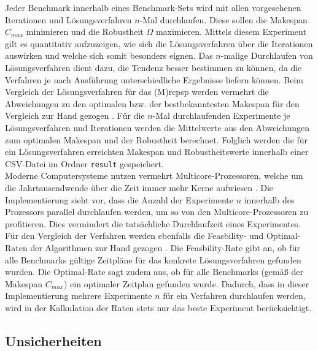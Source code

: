 Jeder Benchmark innerhalb eines Benchmark-Sets wird mit allen vorgesehenen Iterationen und Lösungsverfahren $n$-Mal durchlaufen. Diese sollen die Makespan $C_{max}$ minimieren und die Robustheit $\Omega$ maximieren. Mittels diesem Experiment gilt es quantitativ aufzuzeigen, wie sich die Lösungsverfahren über die Iterationen auswirken und welche sich somit besonders eignen. Das $n$-malige Durchlaufen von Lösungsverfahren dient dazu, die Tendenz besser bestimmen zu können, da die Verfahren je nach Ausführung unterschiedliche Ergebnisse liefern können. Beim Vergleich der Lösungsverfahren für das (M)\ac{rcpsp} werden vermehrt die Abweichungen zu den optimalen bzw. der bestbekanntesten Makespan für den Vergleich zur Hand gezogen \cite[vgl.][S. 16 ff.]{kolisch_heuristic_1998} \cite[vgl.][S. 147]{jozefowska_simulated_2001} \cite[vgl.][S. 10]{hartmann_competitive_1998}. Für die $n$-Mal durchlaufenden Experimente je Lösungsverfahren und Iterationen werden die Mittelwerte aus den Abweichungen zum optimalen Makespan und der Robustheit berechnet. Folglich werden die für ein Lösungsverfahren erreichten Makespan und Robustheitswerte innerhalb einer CSV-Datei im Ordner \lstinline|result| gespeichert. \\

Moderne Computersysteme nutzen vermehrt Multicore-Prozessoren, welche um die Jahrtausendwende über die Zeit immer mehr Kerne aufwiesen \cite[vgl.][S. 12]{harrod_journey_2012}. Die Implementierung sieht vor, dass die Anzahl der Experimente $n$ innerhalb des Prozessors parallel durchlaufen werden, um so von den Multicore-Prozessoren zu profitieren. Dies vermindert die tatsächliche Durchlaufzeit eines Experimentes. \\

Für den Vergleich der Verfahren werden ebenfalls die Feasbility- und Optimal-Raten der Algorithmen zur Hand gezogen \cite[vgl.][S. 147 ff.]{jozefowska_simulated_2001} \cite[vgl.][S. 10 f.]{hartmann_competitive_1998}. Die Feasbility-Rate gibt an, ob für alle Benchmarks gültige Zeitpläne für das konkrete Lösungsverfahren gefunden wurden. Die Optimal-Rate sagt zudem aus, ob für alle Benchmarks (gemäß der Makespan $C_{max}$) ein optimaler Zeitplan gefunden wurde. Dadurch, dass in dieser Implementierung mehrere Experimente $n$ für ein Verfahren durchlaufen werden, wird in der Kalkulation der Raten stets nur das beste Experiment berücksichtigt. 

\subsection{Unsicherheiten} 
\label{subsec:VergleichUnsicherheiten}

